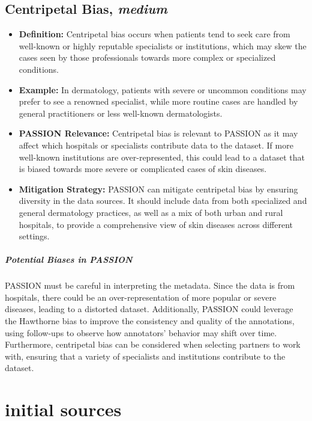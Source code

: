 \begin{refsection}
		\subsection{Centripetal Bias, \textit{medium}}
		\begin{itemize}
			\item \textbf{Definition:} Centripetal bias occurs when patients tend to seek care from well-known or highly reputable specialists or institutions, which may skew the cases seen by those professionals towards more complex or specialized conditions.
			\item \textbf{Example:} In dermatology, patients with severe or uncommon conditions may prefer to see a renowned specialist, while more routine cases are handled by general practitioners or less well-known dermatologists.
			\item \textbf{PASSION Relevance:} Centripetal bias is relevant to PASSION as it may affect which hospitals or specialists contribute data to the dataset. If more well-known institutions are over-represented, this could lead to a dataset that is biased towards more severe or complicated cases of skin diseases.
			\item \textbf{Mitigation Strategy:} PASSION can mitigate centripetal bias by ensuring diversity in the data sources. It should include data from both specialized and general dermatology practices, as well as a mix of both urban and rural hospitals, to provide a comprehensive view of skin diseases across different settings.
		\end{itemize}
		
		\subparagraph{Potential Biases in PASSION}
		PASSION must be careful in interpreting the metadata. Since the data is from hospitals, there could be an over-representation of more popular or severe diseases, leading to a distorted dataset. Additionally, PASSION could leverage the Hawthorne bias to improve the consistency and quality of the annotations, using follow-ups to observe how annotators' behavior may shift over time. Furthermore, centripetal bias can be considered when selecting partners to work with, ensuring that a variety of specialists and institutions contribute to the dataset.
		
		
		
		\section{initial sources}

\end{refsection}
